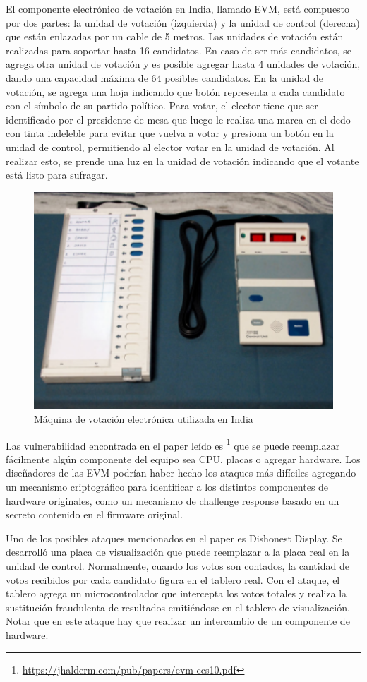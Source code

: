 El componente electrónico de votación en India, llamado EVM, está compuesto por dos partes: la unidad de votación (izquierda) y la unidad de control (derecha) que están enlazadas por un cable de 5 metros. Las unidades de votación están realizadas para soportar hasta 16 candidatos. En caso de ser más candidatos, se agrega otra unidad de votación y es posible agregar hasta 4 unidades de votación, dando una capacidad máxima de 64 posibles candidatos. En la unidad de votación, se agrega una hoja indicando que botón representa a cada candidato con el símbolo de su partido político. Para votar, el elector tiene que ser identificado por el presidente de mesa que luego le realiza una marca en el dedo con tinta indeleble para evitar que vuelva a votar y presiona un botón en la unidad de control, permitiendo al elector votar en la unidad de votación. Al realizar esto, se prende una luz en la unidad de votación indicando que el votante está listo para sufragar.

\begin{figure}[h]
\includegraphics{Imagenes/almacenamiento1}
\caption{Máquina de votación electrónica utilizada en India}
\end{figure}

Las vulnerabilidad encontrada en el paper leído es
\footnote{\url{https://jhalderm.com/pub/papers/evm-ccs10.pdf}}
que se puede reemplazar fácilmente algún componente del equipo sea CPU, placas o agregar hardware. Los diseñadores de las EVM podrían haber hecho los ataques más difíciles agregando un mecanismo criptográfico para identificar a los distintos componentes de hardware originales, como un mecanismo de challenge response basado en un secreto contenido en el firmware original.

Uno de los posibles ataques mencionados en el paper es Dishonest Display. Se desarrolló una placa de visualización que puede reemplazar a la placa real en la unidad de control. Normalmente, cuando los votos son contados, la cantidad de votos recibidos por cada candidato figura en el tablero real. Con el ataque, el tablero agrega un microcontrolador que intercepta los votos totales y realiza la sustitución fraudulenta de resultados emitiéndose en el tablero de visualización. Notar que en este ataque hay que realizar un intercambio de un componente de hardware.

